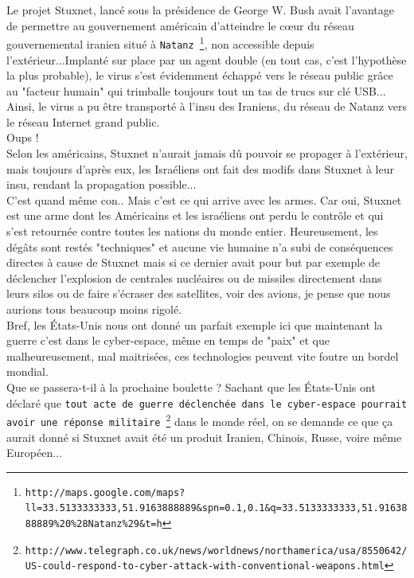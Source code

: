 \documentclass[11pt,twoside,a4paper]{article}
\begin{document}
Le projet Stuxnet, lanc{\'e} sous la pr{\'e}sidence de George W. Bush avait l'avantage de permettre au gouvernement am{\'e}ricain d'atteindre le c\oe ur du r{\'e}seau gouvernemental iranien situ{\'e} {\`a} \texttt{Natanz~\footnote{\texttt{http://maps.google.com/maps?ll=33.5133333333,51.9163888889\&spn=0.1,0.1\&q=33.5133333333,51.9163888889\%20\%28Natanz\%29\&t=h}}}, non accessible depuis l'ext{\'e}rieur...Implant{\'e} sur place par un agent double (en tout cas, c'est l'hypoth{\`e}se la plus probable), le virus s'est {\'e}videmment {\'e}chapp{\'e} vers le r{\'e}seau public gr{\^a}ce au "facteur humain" qui trimballe toujours tout un tas de trucs sur cl{\'e} USB... Ainsi, le virus a pu {\^e}tre transport{\'e} {\`a} l'insu des Iraniens, du r{\'e}seau de Natanz vers le r{\'e}seau Internet grand public.~\\

Oups !~\\

Selon les am{\'e}ricains, Stuxnet n'aurait jamais d{\^u} pouvoir se propager {\`a} l'ext{\'e}rieur, mais toujours d'apr{\`e}s eux, les Isra{\'e}liens ont fait des modifs dans Stuxnet {\`a} leur insu, rendant la propagation possible...~\\

C'est quand m{\^e}me con.. Mais c'est ce qui arrive avec les armes. Car oui, Stuxnet est une arme dont les Am{\'e}ricains et les isra{\'e}liens ont perdu le contr{\^o}le et qui s'est retourn{\'e}e contre toutes les nations du monde entier. Heureusement, les d{\'e}g{\^a}ts sont rest{\'e}s "techniques" et aucune vie humaine n'a subi de cons{\'e}quences directes {\`a} cause de Stuxnet mais si ce dernier avait pour but par exemple de d{\'e}clencher l'explosion de centrales nucl{\'e}aires ou de missiles directement dans leurs silos ou de faire s'{\'e}craser des satellites, voir des avions, je pense que nous aurions tous beaucoup moins rigol{\'e}.~\\

Bref, les {\'E}tats-Unis nous ont donn{\'e} un parfait exemple ici que maintenant la guerre c'est dans le cyber-espace, m{\^e}me en temps de "paix" et que malheureusement, mal maitris{\'e}es, ces technologies peuvent vite foutre un bordel mondial.~\\

Que se passera-t-il {\`a} la prochaine boulette ? Sachant que les {\'E}tats-Unis ont d{\'e}clar{\'e} que \texttt{tout acte de guerre d{\'e}clench{\'e}e dans le cyber-espace pourrait avoir une r{\'e}ponse militaire~\footnote{\texttt{http://www.telegraph.co.uk/news/worldnews/northamerica/usa/8550642/US-could-respond-to-cyber-attack-with-conventional-weapons.html}}} dans le monde r{\'e}el, on se demande ce que \c{c}a aurait donn{\'e} si Stuxnet avait {\'e}t{\'e} un produit Iranien, Chinois, Russe, voire m{\^e}me Europ{\'e}en...~\\
\end{document}
